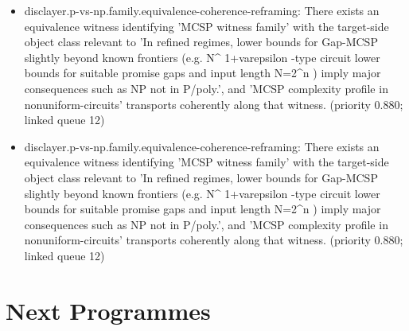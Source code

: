 \documentclass[11pt]{article}
\begin{document}
\begin{itemize}
\item disclayer.p-vs-np.family.equivalence-coherence-reframing: There exists an equivalence witness identifying 'MCSP witness family' with the target-side object class relevant to 'In refined regimes, lower bounds for Gap-MCSP slightly beyond known frontiers (e.g. N\textasciicircum{} 1+varepsilon -type circuit lower bounds for suitable promise gaps and input length N=2\textasciicircum{}n ) imply major consequences such as NP not in P/poly.', and 'MCSP complexity profile in nonuniform-circuits' transports coherently along that witness. (priority 0.880; linked queue 12)
\item disclayer.p-vs-np.family.equivalence-coherence-reframing: There exists an equivalence witness identifying 'MCSP witness family' with the target-side object class relevant to 'In refined regimes, lower bounds for Gap-MCSP slightly beyond known frontiers (e.g. N\textasciicircum{} 1+varepsilon -type circuit lower bounds for suitable promise gaps and input length N=2\textasciicircum{}n ) imply major consequences such as NP not in P/poly.', and 'MCSP complexity profile in nonuniform-circuits' transports coherently along that witness. (priority 0.880; linked queue 12)
\end{itemize}

\section*{Next Programmes}
\end{document}

